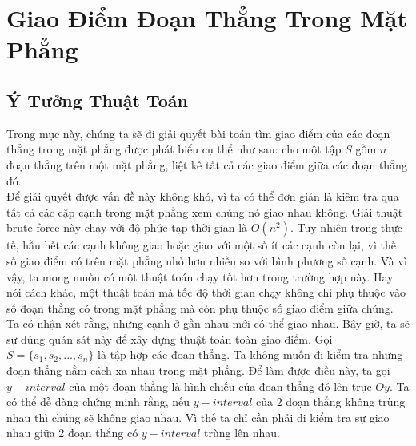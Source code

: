 \documentclass[15pt]{article}
\begin{document}
{\Large
\section{Giao Điểm Đoạn Thẳng Trong Mặt Phẳng}
\subsection{Ý Tưởng Thuật Toán}
Trong mục này, chúng ta sẽ đi giải quyết bài toán tìm giao điểm của các đoạn thẳng trong mặt phẳng được phát biểu cụ thể như sau: cho một tập $S$ gồm $n$ đoạn thẳng trên một mặt phẳng, liệt kê tất cả các giao điểm giữa các đoạn thẳng đó. \\

Để giải quyết được vấn đề này không khó, vì ta có thể đơn giản là kiêm tra qua tất cả các cặp cạnh trong mặt phẳng xem chúng nó giao nhau không. Giải thuật brute-force này chạy với độ phức tạp thời gian là $O(n^2)$. Tuy nhiên trong thực tế, hầu hết các cạnh không giao hoặc giao với một số ít các cạnh còn lại, vì thế số giao điểm có trên mặt phẳng nhỏ hơn nhiều so với bình phương số cạnh. Và vì vậy, ta mong muốn có một thuật toán chạy tốt hơn trong trường hợp này. Hay nói cách khác, một thuật toán mà tốc độ thời gian chạy không chỉ phụ thuộc vào số đoạn thẳng có trong mặt phẳng mà còn phụ thuộc số giao điểm giữa chúng. \\

Ta có nhận xét rằng, những cạnh ở gần nhau mới có thể giao nhau. Bây giờ, ta sẽ sự dủng quán sát này để xây dựng thuật toán toàn giao điểm. Gọi $S = \{s_1, s_2, ..., s_n \}$ là tập hợp các đoạn thẳng. Ta không muốn đi kiểm tra những đoạn thẳng nằm cách xa nhau trong mặt phẳng. Để làm được điều này, ta gọi $y-interval$ của một đoạn thẳng là hình chiếu của đoạn thẳng đó lên trục $Oy$. Ta có thể dễ dàng chứng minh rằng, nếu $y-interval$ của 2 đoạn thẳng không trùng nhau thì chúng sẽ không giao nhau. Vì thế ta chỉ cần phải đi kiểm tra sự giao nhau giữa 2 đoạn thẳng có $y-interval$ trùng lên nhau. \\

}
\end{document}
